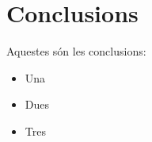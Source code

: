 
\section{Conclusions}
Aquestes són les conclusions:

\begin{itemize}
\item Una
\item Dues
\item Tres
\end{itemize}
